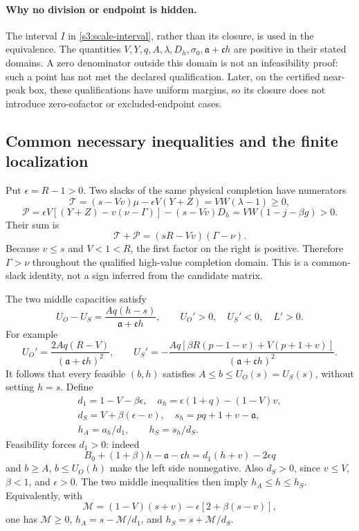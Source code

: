 \documentclass[11pt,reqno]{amsart}
\theoremstyle{definition}
\theoremstyle{remark}
\begin{document}
\paragraph{Why no division or endpoint is hidden.}
The interval \(I\) in \eqref{s3:scale-interval}, rather than its
closure, is used in the equivalence. The quantities
\(V,Y,q,A,\lambda,D_h,\sigma_0,\mathfrak a+\mathfrak c h\)
are positive in their stated domains. A zero denominator outside
this domain is not an infeasibility proof: such a point has not met
the declared qualification. Later, on the certified near-peak box,
these qualifications have uniform margins, so its closure does not
introduce zero-cofactor or excluded-endpoint cases.

\subsection{Common necessary inequalities and the finite localization}
\label{s3:localization-section}

Put \(\epsilon=R-1>0\). Two slacks of the same physical completion
have numerators
\[
 \mathcal T=(s-Vv)\mu-\epsilon V(Y+Z)=VW(\lambda-1)\ge0,
\]
\[
 \mathcal P=\epsilon V[(Y+Z)-v(\nu-\Gamma)]-(s-Vv)D_h
           =VW(1-j-\beta g)>0.
\]
Their sum is
\begin{equation}\label{s3:gamma-nu}
 \mathcal T+\mathcal P=(sR-Vv)(\Gamma-\nu).
\end{equation}
Because \(v\le s\) and \(V<1<R\), the first factor on the
right is positive. Therefore \(\Gamma>\nu\) throughout the
qualified high-value completion domain. This is a common-slack
identity, not a sign inferred from the candidate matrix.

The two middle capacities satisfy
\[
 U_O-U_S=\frac{Aq(h-s)}{\mathfrak a+\mathfrak c h},\qquad
 U_O'>0,\quad U_S'<0,\quad L'>0.
\]
For example
\[
 U_O'=\frac{2Aq(R-V)}{(\mathfrak a+\mathfrak c h)^2},\qquad
 U_S'=-\frac{Aq[\beta R(p-1-v)+V(p+1+v)]}
                  {(\mathfrak a+\mathfrak c h)^2}.
\]
It follows that every feasible \((b,h)\) satisfies
\(A\le b\le U_O(s)=U_S(s)\), without setting \(h=s\).
Define
\begin{equation}\label{s3:h-brackets}
\begin{gathered}
 d_1=1-V-\beta\epsilon,\quad
 a_h=\epsilon(1+q)-(1-V)v,\\
 d_S=V+\beta(\epsilon-v),\quad
 s_h=pq+1+v-\mathfrak a,\\
 h_A=a_h/d_1,\qquad h_S=s_h/d_S.
\end{gathered}
\end{equation}
Feasibility forces \(d_1>0\): indeed
\[
 B_0+(1+\beta)h-\mathfrak a-\mathfrak c h
       =d_1(h+v)-2\epsilon q
\]
and \(b\ge A\), \(b\le U_O(h)\) make the left side
nonnegative. Also \(d_S>0\), since \(v\le V\), \(\beta<1\),
and \(\epsilon>0\). The two middle inequalities then imply
\(h_A\le h\le h_S\). Equivalently, with
\[
 \mathcal M=(1-V)(s+v)-\epsilon[2+\beta(s-v)],
\]
one has \(\mathcal M\ge0\),
\(h_A=s-\mathcal M/d_1\), and \(h_S=s+\mathcal M/d_S\).
\end{document}
